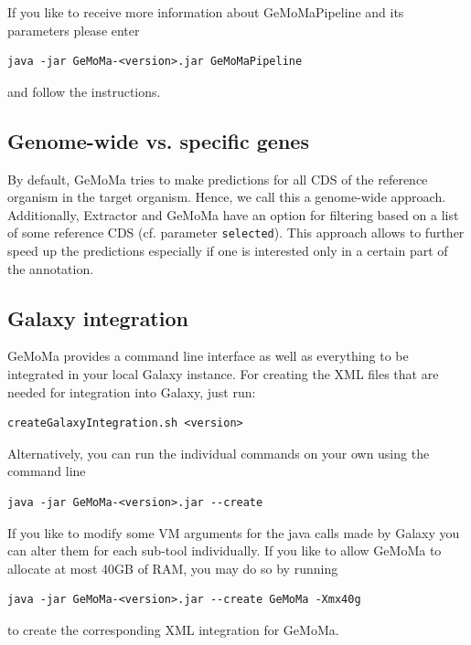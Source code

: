 \documentclass{article}
\begin{document}
If you like to receive more information about GeMoMaPipeline and its parameters please enter
\begin{verbatim}
java -jar GeMoMa-<version>.jar GeMoMaPipeline
\end{verbatim}
and follow the instructions.

\subsection{Genome-wide vs. specific genes}
By default, GeMoMa tries to make predictions for all CDS of the reference organism in the target organism. Hence, we call this a genome-wide approach. Additionally, Extractor and GeMoMa have an option for filtering based on a list of some reference CDS (cf. parameter \texttt{selected}). This approach allows to further speed up the predictions especially if one is interested only in a certain part of the annotation.

\subsection{Galaxy integration}
GeMoMa provides a command line interface as well as everything to be integrated in your local Galaxy instance. For creating the XML files that are needed for integration into Galaxy, just run: 
\begin{verbatim}
createGalaxyIntegration.sh <version>
\end{verbatim}

Alternatively, you can run the individual commands on your own using the command line
\begin{verbatim}
java -jar GeMoMa-<version>.jar --create
\end{verbatim}
If you like to modify some VM arguments for the java calls made by Galaxy you can alter them for each sub-tool individually. If you like to allow GeMoMa to allocate at most 40GB of RAM, you may do so by running
\begin{verbatim}
java -jar GeMoMa-<version>.jar --create GeMoMa -Xmx40g
\end{verbatim}
to create the corresponding XML integration for GeMoMa.
\end{document}
